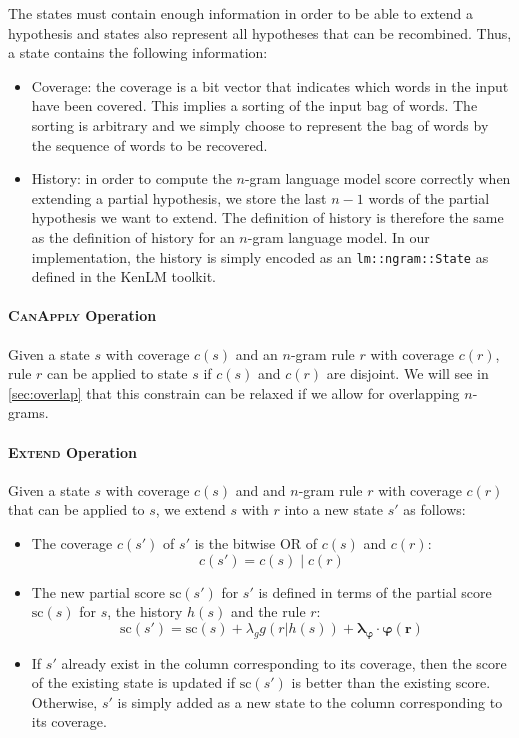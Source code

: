 The states must
contain enough information
in order to be able to extend a hypothesis and
states also represent
all hypotheses that can be recombined. Thus, a state
contains the following information:
%
\begin{itemize}
  \item Coverage: the coverage is a bit vector that indicates
    which words in the input have been covered. This implies a
    sorting of the input bag of words. The sorting is arbitrary
    and we simply choose to represent the bag of words by the
    sequence of words to be recovered. %
  \item History: in order to compute the $n$-gram language model
    score correctly when extending a partial hypothesis, we
    store the last $n-1$ words of the partial hypothesis we want
    to extend. The definition of history is therefore the same
    as the definition of history for an $n$-gram language model.
    In our implementation, the history is simply encoded as
    an \texttt{lm::ngram::State} as defined in the KenLM toolkit.
\end{itemize}

\paragraph{\textsc{CanApply} Operation}
\label{sec:canApply}

Given a state $s$ with coverage $c(s)$ and an $n$-gram rule $r$ with
coverage $c(r)$, rule $r$ can be applied to state $s$ if $c(s)$ and
$c(r)$ are disjoint. We will see in \autoref{sec:overlap}
that this constrain can be relaxed if we allow for overlapping
$n$-grams.

\paragraph{\textsc{Extend} Operation}

Given a state $s$ with coverage $c(s)$ and and $n$-gram rule $r$
with coverage $c(r)$ that can be applied to $s$, we extend
$s$ with $r$ into a new state $s'$ as follows:
%
\begin{itemize}
  \item The coverage $c(s')$ of $s'$ is the bitwise OR
    of $c(s)$ and $c(r)$:
%
\begin{equation}
  c(s') = c(s) \mid c(r)
\end{equation}
%
  \item The new partial score $\text{sc}(s')$ for $s'$ is defined in terms
    of the partial score $\text{sc}(s)$ for $s$, the history $h(s)$ and the rule $r$:
%
\begin{equation}
  \text{sc}(s') = \text{sc}(s) + \lambda_g g(r | h(s)) + \bm{\lambda_{\varphi}} \cdot \bm{\varphi(r)}
\end{equation}
%
  \item If $s'$ already exist in the column corresponding to its coverage, then
    the score of the existing state is updated if $\text{sc}(s')$ is better than
    the existing score. Otherwise, $s'$ is simply added as a new state to the column corresponding
    to its coverage.
\end{itemize}
%

